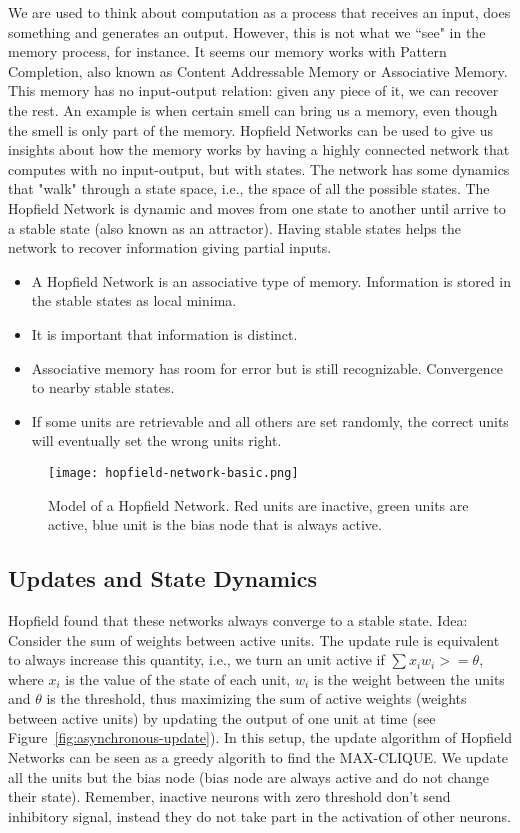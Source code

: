 \documentclass[main]{subfiles}
\begin{document}
We are used to think about computation as a process that receives an input, does something and generates an output.
However, this is not what we ``see" in the memory process, for instance.
It seems our memory works with Pattern Completion, also known as Content Addressable Memory or Associative Memory.
This memory has no input-output relation: given any piece of it, we can recover the rest.
An example is when certain smell can bring us a memory, even though the smell is only part of the memory.
Hopfield Networks can be used to give us insights about how the memory works by having a highly connected network that computes with no input-output, but with states.
The network has some dynamics that "walk" through a state space, i.e., the space of all the possible states. The Hopfield Network is dynamic and moves from one state to another until arrive to a stable state (also known as an attractor). Having stable states helps the network to recover information giving partial inputs.


\begin{itemize}[noitemsep,nolistsep]
	\item A Hopfield Network is an associative type of memory. Information is stored in the stable states as local minima.
	\item It is important that information is distinct.
	\item Associative memory has room for error but is still recognizable. Convergence to nearby stable states.
	\item If some units are retrievable and all others are set randomly, the correct units will eventually set the wrong units right.
\end{itemize}

\begin{figure}[H]
	\centering
	\texttt{[image: hopfield-network-basic.png]}
	\caption{Model of a Hopfield Network. Red units are inactive, green units are active, blue unit is the bias node that is always active.}
\end{figure}

\subsection{Updates and State Dynamics}

Hopfield found that these networks always converge to a stable state.
Idea: Consider the sum of weights between active units.
The update rule is equivalent to always increase this quantity, i.e., we turn an unit active if $\sum x_i w_i >= \theta$, where $x_i$ is the value of the state of each unit, $w_i$ is the weight between the units and $\theta$ is the threshold, thus maximizing the sum of active weights (weights between active units) by updating the output of one unit at time (see Figure~\ref{fig:asynchronous-update}).
In this setup, the update algorithm of Hopfield Networks can be seen as a greedy algorith to find the MAX-CLIQUE.
We update all the units but the bias node (bias node are always active and do not change their state).
Remember, inactive neurons with zero threshold don't send inhibitory signal, instead they do not take part in the activation of other neurons.
\end{document}
